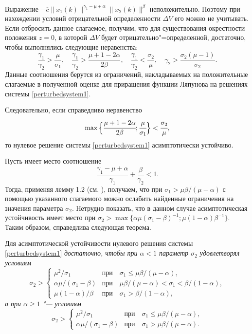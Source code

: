 Выражение  $-\overline{c} \|x_1(k)\|^{\gamma_1-\mu+
\alpha}\|x_2(k)\|^{\beta}$ неположительно. Поэтому при нахождении
условий отрицательной определенности $\Delta V$  его можно не
учитывать. Если отбросить данное слагаемое, получим, что для
существования окрестности положения $z=0$, в которой $\Delta V$ будет отрицательно"=определенной, достаточно, чтобы выполнялись
следующие неравенства:
\begin{equation*}
\frac{\gamma_1}{\gamma_2}>\frac{\mu}{\sigma_1},\quad
\frac{\gamma_1}{\gamma_2}>\frac{\mu+1-2\alpha}{2\beta},
\quad\frac{\gamma_1}{\gamma_2}<\frac{\sigma_2}{\mu},\quad\gamma_2>\frac{\sigma_2(\mu-1)}{\sigma_2}.
\end{equation*}
Данные соотношения берутся из ограничений, накладываемых на положительные слагаемые
в полученной оценке для приращения функции Ляпунова на решениях системы
\eqref{perturbedsystem1}.

Следовательно, если справедливо неравенство
$$\max \Big\{\cfrac{\mu+1-2\alpha}{2\beta};\cfrac{\mu}{\sigma_1}\Big\}<\cfrac{\sigma_2}{\mu},$$ то
нулевое решение системы \eqref{perturbedsystem1} асимптотически устойчиво.

Пусть имеет место соотношение
$$
\frac{\gamma_1-\mu+\alpha}{\gamma_1}+\frac{\beta}{\gamma_2}<1.
$$
Тогда, применяя лемму 1.2 (см. \cite[с.~9]{sultan:bib15}), получаем, что при
$\sigma_1>\mu\beta/(\mu-\alpha)$ с помощью указанного
слагаемого можно ослабить найденные ограничения  на
значения параметра $\sigma_2$. Нетрудно показать, что в данном
случае асимптотическая устойчивость имеет место при
$\sigma_2>\max\{{\alpha\mu}({\sigma_1-\beta})^{-1}; {\mu(1-\alpha)}{\beta}^{-1}\}$.
Таким образом, справедлива следующая теорема.

\smallskip

\begin{theorem}[4] Для асимптотической устойчивости нулевого
решения системы \eqref{perturbedsystem1} \it достаточно, чтобы при
$\alpha<1$ параметр $\sigma_2$ удовлетворял условиям
\begin{equation*}\sigma_2>
\begin{cases}
\mu^2/\sigma_1& \text{при}\quad \sigma_1\leq \mu\beta/(\mu-\alpha),\\
\alpha\mu/(\sigma_1-\beta)&\text{при}\quad\mu\beta/(\mu-\alpha)<\sigma_1<\beta/(1-\alpha),\\
\mu(1-\alpha)/\beta  &\text{при}\quad \sigma_1>
\beta/(1-\alpha),
\end{cases}
\end{equation*}
а при $\alpha\geq1$ "--- условиям
\begin{equation*}\sigma_2>
\begin{cases}
\mu^2/\sigma_1&\text{при}\quad \sigma_1\leq \mu\beta/(\mu-\alpha),\\
\alpha\mu/(\sigma_1-\beta)&\text{при}\quad \sigma_1>\mu\beta/(\mu-\alpha).
\end{cases}
\end{equation*}
\end{theorem}


